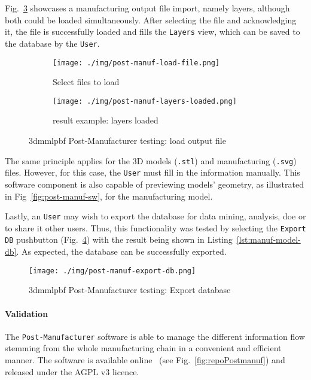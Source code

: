 Fig.~\ref{fig:post-manuf-load-out} showcases a manufacturing output file
import, namely layers, although both could be loaded simultaneously. After
selecting the file and acknowledging it, the file is successfully loaded and
fills the \texttt{Layers} view, which can be saved to the database by the \texttt{User}.
\begin{figure}[htb!]
  \centering
  \begin{subfigure}[t]{.70\textwidth}
    \texttt{[image: ./img/post-manuf-load-file.png]}
  \caption{Select files to load}%
  \label{fig:post-manuf-load-out-1}
  \end{subfigure}
%
  \begin{subfigure}[t]{.70\textwidth}
    \texttt{[image: ./img/post-manuf-layers-loaded.png]}
  \caption{result example: layers loaded}%
  \label{fig:post-manuf-load-out-2}
  \end{subfigure}
  \caption{\gls{3dmmlpbf} Post-Manufacturer testing: load output file}%
  \label{fig:post-manuf-load-out}
\end{figure}

The same principle applies for the 3D models (\texttt{.stl}) and manufacturing
(\texttt{.svg}) files. However, for this case, the \texttt{User} must fill in
the information manually. This software component is also capable of previewing
models' geometry, as illustrated in Fig~\ref{fig:post-manuf-sw}, for the
manufacturing model.

Lastly, an \texttt{User} may wish to export the database for data mining,
analysis, \gls{doe} or to share it other users. Thus, this functionality was
tested by selecting the \texttt{Export DB} pushbutton
(Fig.~\ref{fig:post-manuf-export-db}) with the result being shown in
Listing~\ref{lst:manuf-model-db}. As expected, the database can be
successfully exported.
%
\begin{figure}[!hbt]
  \centering
    \texttt{[image: ./img/post-manuf-export-db.png]}
  \caption{\gls{3dmmlpbf} Post-Manufacturer testing: Export database}%
  \label{fig:post-manuf-export-db}
\end{figure}
%
%

\paragraph{Validation}
The \texttt{Post-Manufacturer} software is able to manage the different
information flow stemming from the whole manufacturing chain in a convenient and
efficient manner.
%
The software is available online~\cite{repoPostmanuf} (see Fig.~\ref{fig:repoPostmanuf}) and released
under the AGPL v3 licence.


